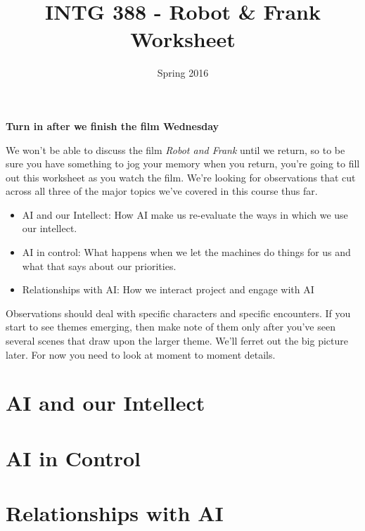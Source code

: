 \documentclass[nobib]{tufte-handout}
\title{INTG 388 - Robot \& Frank Worksheet}
\author{}
\date{ Spring 2016 }
\begin{document}
\maketitle
\thispagestyle{empty} 

\begin{center}
\textbf{Turn in after we finish the film Wednesday}
\end{center}

We won't be able to discuss the film \textit{Robot and Frank} until we return, so to be sure you have something to jog your memory when you return, you're going to fill out this worksheet as you watch the film. We're looking for observations that cut across all three of the major topics we've covered in this course thus far.

\begin{itemize}
\item AI and our Intellect:  How AI make us re-evaluate the ways in which we use our intellect.
\item AI in control: What happens when we let the machines do things for us and what that says about our priorities.
\item Relationships with AI: How we interact project and engage with AI 
\end{itemize}


Observations should deal with specific characters and specific encounters. If you start to see themes emerging, then make note of them only after you've seen several scenes that draw upon the larger theme. We'll ferret out the big picture later.  For now you need to look at moment to moment details.

\newpage \thispagestyle{empty} 
\section*{AI and our Intellect}
\newpage \thispagestyle{empty} 
\section*{AI in Control}
\newpage \thispagestyle{empty} 
\section*{Relationships with AI}
\end{document}
